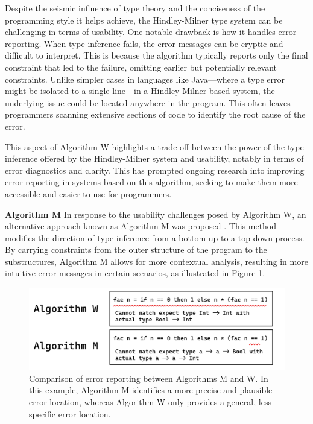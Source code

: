 Despite the seismic influence of type theory and the conciseness of the programming style it helps achieve,  the Hindley-Milner type system can be challenging in terms of usability. One notable drawback is how it handles error reporting. When type inference fails, the error messages can be cryptic and difficult to interpret. This is because the algorithm typically reports only the final constraint that led to the failure, omitting earlier but potentially relevant constraints. Unlike simpler cases in languages like Java—where a type error might be isolated to a single line—in a Hindley-Milner-based system, the underlying issue could be located anywhere in the program. This often leaves programmers scanning extensive sections of code to identify the root cause of the error. 

This aspect of Algorithm W highlights a trade-off between the power of the type inference offered by the Hindley-Milner system and usability, notably in terms of error diagnostics and clarity. This has prompted ongoing research into improving error reporting in systems based on this algorithm, seeking to make them more accessible and easier to use for programmers.

\textbf{Algorithm M} 
In response to the usability challenges posed by Algorithm W, an alternative approach known as Algorithm M was proposed \cite{Lee1998-fx}. This method modifies the direction of type inference from a bottom-up to a top-down process. By carrying constraints from the outer structure of the program to the substructures, Algorithm M allows for more contextual analysis, resulting in more intuitive error messages in certain scenarios, as illustrated in Figure \ref{fig:algorithm-m-1}. 

\begin{figure}[hbt]
  \includegraphics[width=0.8\linewidth]{AlgorithmWM1.pdf}
  \caption{
    \label{fig:algorithm-m-1}
    Comparison of error reporting between Algorithms M and W. In this example, Algorithm M identifies a more precise and plausible error location, whereas Algorithm W only provides a general, less specific error location.}
\end{figure}


